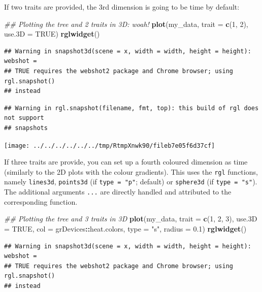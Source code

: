 \documentclass[
]{book}
\newenvironment{Shaded}{\begin{snugshade}}{\end{snugshade}}
\newcommand{\CommentTok}[1]{\textcolor[rgb]{0.56,0.35,0.01}{\textit{#1}}}
\newcommand{\DataTypeTok}[1]{\textcolor[rgb]{0.13,0.29,0.53}{#1}}
\newcommand{\DecValTok}[1]{\textcolor[rgb]{0.00,0.00,0.81}{#1}}
\newcommand{\FloatTok}[1]{\textcolor[rgb]{0.00,0.00,0.81}{#1}}
\newcommand{\KeywordTok}[1]{\textcolor[rgb]{0.13,0.29,0.53}{\textbf{#1}}}
\newcommand{\NormalTok}[1]{#1}
\newcommand{\OperatorTok}[1]{\textcolor[rgb]{0.81,0.36,0.00}{\textbf{#1}}}
\newcommand{\OtherTok}[1]{\textcolor[rgb]{0.56,0.35,0.01}{#1}}
\newcommand{\StringTok}[1]{\textcolor[rgb]{0.31,0.60,0.02}{#1}}
\begin{document}
If two traits are provided, the 3rd dimension is going to be time by default:

\begin{Shaded}
\begin{Highlighting}[]
\CommentTok{\#\# Plotting the tree and 2 traits in 3D: woah!}
\KeywordTok{plot}\NormalTok{(my\_data, }\DataTypeTok{trait =} \KeywordTok{c}\NormalTok{(}\DecValTok{1}\NormalTok{, }\DecValTok{2}\NormalTok{), }\DataTypeTok{use.3D =} \OtherTok{TRUE}\NormalTok{)}
\KeywordTok{rglwidget}\NormalTok{()}
\end{Highlighting}
\end{Shaded}

\begin{verbatim}
## Warning in snapshot3d(scene = x, width = width, height = height): webshot =
## TRUE requires the webshot2 package and Chrome browser; using rgl.snapshot()
## instead
\end{verbatim}

\begin{verbatim}
## Warning in rgl.snapshot(filename, fmt, top): this build of rgl does not support
## snapshots
\end{verbatim}

\texttt{[image: ../../../../../../tmp/RtmpXnwk90/fileb7e05f6d37cf]}

If three traits are provide, you can set up a fourth coloured dimension as time (similarly to the 2D plots with the colour gradients).
This uses the \texttt{rgl} functions, namely \texttt{lines3d}, \texttt{points3d} (if \texttt{type\ =\ "p"}; default) or \texttt{sphere3d} (if \texttt{type\ =\ "s"}).
The additional arguments \texttt{...} are directly handled and attributed to the corresponding function.

\begin{Shaded}
\begin{Highlighting}[]
\CommentTok{\#\# Plotting the tree and 3 traits in 3D}
\KeywordTok{plot}\NormalTok{(my\_data, }\DataTypeTok{trait =} \KeywordTok{c}\NormalTok{(}\DecValTok{1}\NormalTok{, }\DecValTok{2}\NormalTok{, }\DecValTok{3}\NormalTok{), }\DataTypeTok{use.3D =} \OtherTok{TRUE}\NormalTok{,}
     \DataTypeTok{col =}\NormalTok{ grDevices}\OperatorTok{::}\NormalTok{heat.colors, }\DataTypeTok{type =} \StringTok{"s"}\NormalTok{, }\DataTypeTok{radius =} \FloatTok{0.1}\NormalTok{)}
\KeywordTok{rglwidget}\NormalTok{()}
\end{Highlighting}
\end{Shaded}

\begin{verbatim}
## Warning in snapshot3d(scene = x, width = width, height = height): webshot =
## TRUE requires the webshot2 package and Chrome browser; using rgl.snapshot()
## instead
\end{verbatim}
\end{document}
